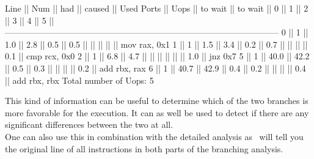 \begin{example}
 Line  ||   Num   ||   had   || caused  ||            Used Ports
       ||   Uops  || to wait || to wait ||   0   ||   1   ||   2   ||   3   ||   4   ||   5   ||
 ------------------------------------------------------------------------------------------------
   0   ||    1    ||   1.0   ||   2.8   ||  0.5  ||  0.5  ||       ||       ||       ||       || mov rax, 0x1
   1   ||    1    ||   1.5   ||   3.4   ||  0.2  ||  0.7  ||       ||       ||       ||  0.1  || cmp rcx, 0x0
   2   ||    1    ||   6.8   ||   4.7   ||       ||       ||       ||       ||       ||  1.0  || jnz 0x7
   5   ||    1    ||  40.0   ||  42.2   ||  0.5  ||  0.3  ||       ||       ||       ||  0.2  || add rbx, rax
   6   ||    1    ||  40.7   ||  42.9   ||  0.4  ||  0.2  ||       ||       ||       ||  0.4  || add rbx, rbx
Total number of Uops: 5
\end{example}

This kind of information can be useful to determine which of the two branches is more favorable for the execution. It can as well be used to detect if there are any significant differences between the two at all.\\
One can also use this in combination with the detailed analysis as \suaca\ will tell you the original line of all instructions in both parts of the branching analysis.

\newpage
